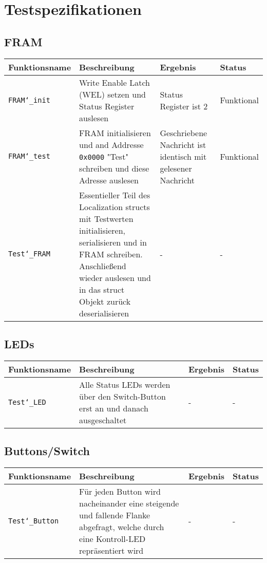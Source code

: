 \documentclass{article}
\begin{document}
	\section{Testspezifikationen}
	\subsection{FRAM}
		\begin{tabular}{|p{3.2cm}|p{5.5cm}|p{4cm}| p{1.6cm} |}
			\hline
				\textbf{Funktionsname} & \textbf{Beschreibung} & \textbf{Ergebnis} & \textbf{Status} \\
			\hline
				\texttt{FRAM\char`_init} & Write Enable Latch (WEL) setzen und Status Register auslesen & Status Register ist 2 & Funktional \\
			\hline
				\texttt{FRAM\char`_test} & FRAM initialisieren und and Addresse \texttt{0x0000} "Test" schreiben und diese Adresse auslesen & Geschriebene Nachricht ist identisch mit gelesener Nachricht & Funktional\\
			\hline
				\texttt{Test\char`_FRAM} & Essentieller Teil des Localization structs mit Testwerten initialisieren, serialisieren und in FRAM schreiben. Anschließend wieder auslesen und in das struct Objekt zurück deserialisieren & - & - \\
			\hline
		\end{tabular}
	\subsection{LEDs}
		\begin{tabular}{|p{3.2cm}|p{5.5cm}|p{4cm}| p{1.6cm} |}
			\hline
				\textbf{Funktionsname} & \textbf{Beschreibung} & \textbf{Ergebnis} & \textbf{Status} \\
			\hline
				 \texttt{Test\char`_LED} & Alle Status LEDs werden über den Switch-Button erst an und danach ausgeschaltet & - & - \\
			\hline
		\end{tabular}
		\subsection{Buttons/Switch}
	\begin{tabular}{|p{3.2cm}|p{5.5cm}|p{4cm}| p{1.6cm} |}
		\hline
			\textbf{Funktionsname} & \textbf{Beschreibung} & \textbf{Ergebnis} & \textbf{Status} \\
		\hline
			 \texttt{Test\char`_Button} & Für jeden Button wird nacheinander eine steigende und fallende Flanke abgefragt, welche durch eine Kontroll-LED repräsentiert wird & - & - \\
		\hline
	\end{tabular}
\end{document}

